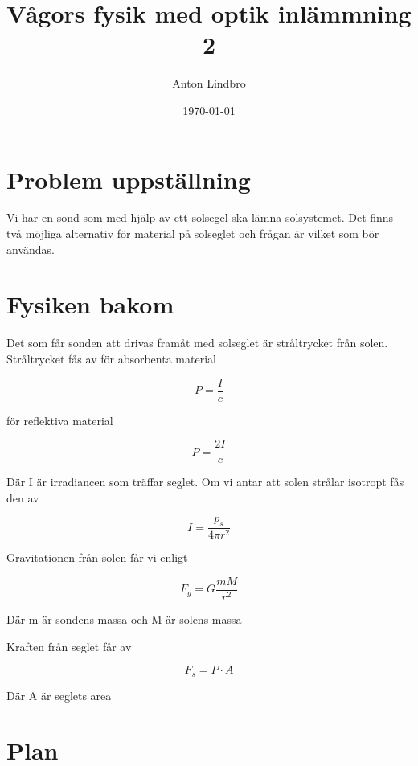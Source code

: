 \documentclass[a4paper]{article}
\title{Vågors fysik med optik inlämmning 2}
\author{Anton Lindbro}
\date{\today}
\begin{document}
\maketitle

\section{Problem uppställning}

Vi har en sond som med hjälp av ett solsegel ska lämna solsystemet. Det finns två möjliga alternativ för material på solseglet och frågan är vilket som bör användas.

\section{Fysiken bakom}

Det som får sonden att drivas framåt med solseglet är stråltrycket från solen. Stråltrycket fås av för absorbenta material

\begin{equation}
    P = \frac{I}{c}
\end{equation}

för reflektiva material

\begin{equation}
    P = \frac{2I}{c}
\end{equation}

Där I är irradiancen som träffar seglet. Om vi antar att solen strålar isotropt fås den av

\begin{equation}
    I = \frac{p_s}{4\pi r^2}
\end{equation}

Gravitationen från solen får vi enligt

\begin{equation}
    F_g = G \frac{mM}{r^2}
\end{equation}

Där m är sondens massa och M är solens massa

Kraften från seglet får av 

\begin{equation}
    F_s = P\cdot A
\end{equation}

Där A är seglets area

\section{Plan}
\end{document}
